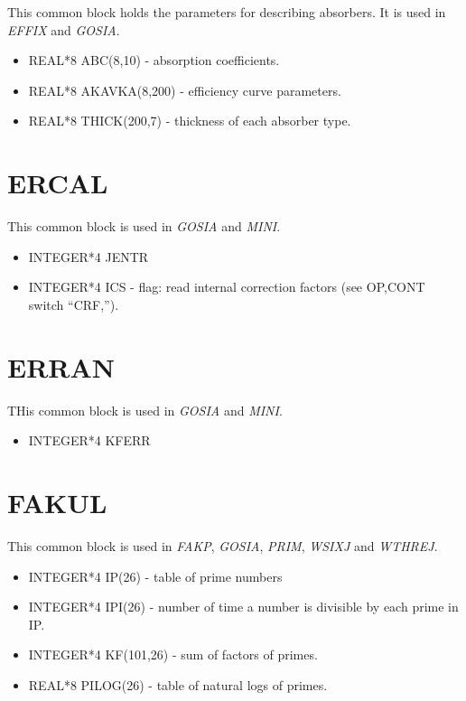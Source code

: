 This common block holds the parameters for describing absorbers. It is used
in {\em EFFIX} and {\em GOSIA}.

\begin{itemize}
\item REAL*8 ABC(8,10) - absorption coefficients.
\item REAL*8 AKAVKA(8,200) - efficiency curve parameters.
\item REAL*8 THICK(200,7) - thickness of each absorber type.
\end{itemize}

\section{ERCAL}

This common block is used in {\em GOSIA} and {\em MINI}.

\begin{itemize}
\item INTEGER*4 JENTR
\item INTEGER*4 ICS - flag: read internal correction factors (see OP,CONT
switch ``CRF,'').
\end{itemize}

\section{ERRAN}

THis common block is used in {\em GOSIA} and {\em MINI}.

\begin{itemize}
\item INTEGER*4 KFERR
\end{itemize}

\section{FAKUL}

This common block is used in {\em FAKP}, {\em GOSIA}, {\em PRIM}, {\em
WSIXJ} and {\em WTHREJ}.

\begin{itemize}
\item INTEGER*4 IP(26) - table of prime numbers
\item INTEGER*4 IPI(26) - number of time a number is divisible by each prime
in IP.
\item INTEGER*4 KF(101,26) - sum of factors of primes.
\item REAL*8 PILOG(26) - table of natural logs of primes.
\end{itemize}

